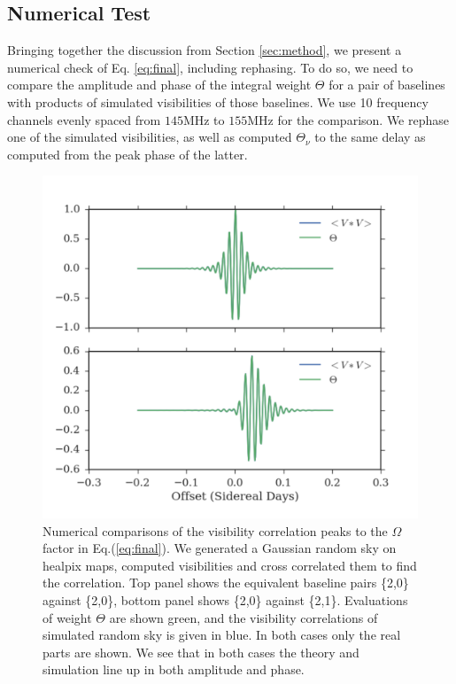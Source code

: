 \documentclass[twocolumn,apj,numberedappendix]{emulateapj}
\renewcommand\[{\begin{equation}}
\renewcommand\]{\end{equation}}
\begin{document}
\subsection{Numerical Test \label{sec:Techniquet}}

Bringing together the discussion from Section \ref{sec:method}, we present a numerical check of Eq. \eqref{eq:final}, including rephasing. To do so, we need to compare the amplitude and phase of the integral weight $\Theta$ 
for a pair of baselines with products of simulated visibilities of those baselines. We use 10 frequency channels evenly spaced from $145$MHz to $155$MHz for the comparison. We rephase one of the simulated visibilities, as well as computed $\Theta_{\nu}$ to the same delay as computed from the peak phase of the latter. 
 
\begin{figure}[h]
\includegraphics[width=\linewidth]{numerics}

\caption{Numerical comparisons of the visibility correlation peaks to the $\Omega$ factor in Eq.(\ref{eq:final}). We generated a Gaussian random sky on healpix maps, computed visibilities and cross correlated them to find the correlation.  Top panel shows the equivalent baseline pairs \{2,0\} against \{2,0\}, bottom panel shows \{2,0\} against \{2,1\}.  Evaluations of weight $\Theta$ are shown green, and the visibility correlations of simulated random sky is given in blue. In both cases only the real parts are shown. We see that in both cases the theory and simulation line up in both amplitude and phase.}
\label{fig:numerics}
\end{figure}
\end{document}
